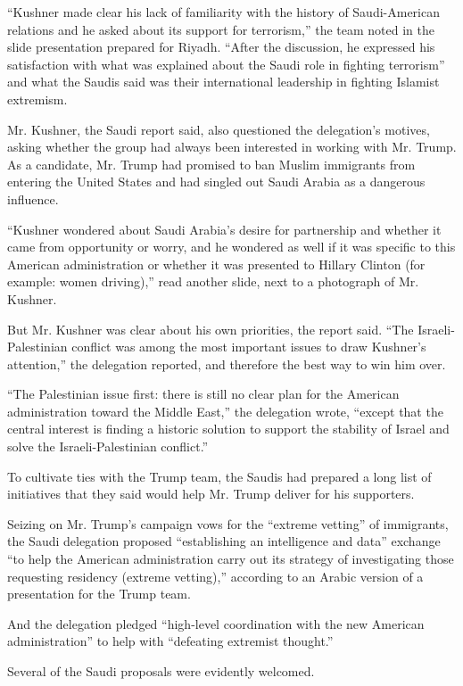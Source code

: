 ``Kushner made clear his lack of familiarity with the history of
Saudi-American relations and he asked about its support for terrorism,''
the team noted in the slide presentation prepared for Riyadh. ``After
the discussion, he expressed his satisfaction with what was explained
about the Saudi role in fighting terrorism'' and what the Saudis said
was their international leadership in fighting Islamist extremism.

Mr. Kushner, the Saudi report said, also questioned the delegation's
motives, asking whether the group had always been interested in working
with Mr. Trump. As a candidate, Mr. Trump had promised to ban Muslim
immigrants from entering the United States and had singled out Saudi
Arabia as a dangerous influence.

``Kushner wondered about Saudi Arabia's desire for partnership and
whether it came from opportunity or worry, and he wondered as well if it
was specific to this American administration or whether it was presented
to Hillary Clinton (for example: women driving),'' read another slide,
next to a photograph of Mr. Kushner.

But Mr. Kushner was clear about his own priorities, the report said.
``The Israeli-Palestinian conflict was among the most important issues
to draw Kushner's attention,'' the delegation reported, and therefore
the best way to win him over.

``The Palestinian issue first: there is still no clear plan for the
American administration toward the Middle East,'' the delegation wrote,
``except that the central interest is finding a historic solution to
support the stability of Israel and solve the Israeli-Palestinian
conflict.''

To cultivate ties with the Trump team, the Saudis had prepared a long
list of initiatives that they said would help Mr. Trump deliver for his
supporters.

Seizing on Mr. Trump's campaign vows for the ``extreme vetting'' of
immigrants, the Saudi delegation proposed ``establishing an intelligence
and data'' exchange ``to help the American administration carry out its
strategy of investigating those requesting residency (extreme
vetting),'' according to an Arabic version of a presentation for the
Trump team.

And the delegation pledged ``high-level coordination with the new
American administration'' to help with ``defeating extremist thought.''

Several of the Saudi proposals were evidently welcomed.

